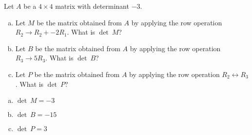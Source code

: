 
\begin{exerciseStatement}


Let \(A\) be a \(4 \times 4\) matrix with determinant \( -3 \).


\begin{enumerate}[(a)]
\item Let \(M\) be the matrix obtained from \(A\) by applying the row operation \( R_2 \to R_2 + -2R_1 \). What is \(\operatorname{det}\ M\)?
\item Let \(B\) be the matrix obtained from \(A\) by applying the row operation \( R_3 \to 5R_3 \). What is \(\operatorname{det}\ B\)?
\item Let \(P\) be the matrix obtained from \(A\) by applying the row operation \( R_2 \leftrightarrow R_3 \). What is \(\operatorname{det}\ P\)?
\end{enumerate}
    
\end{exerciseStatement}
    
\begin{exerciseAnswer} 

\begin{enumerate}[(a)]
\item \(\operatorname{det}\ M= -3 \)
\item \(\operatorname{det}\ B= -15 \)
\item \(\operatorname{det}\ P= 3 \)
\end{enumerate}
    
\end{exerciseAnswer}
    
